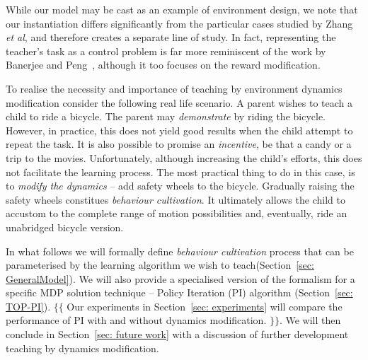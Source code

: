 While our model may be cast as an example of environment design, we
note that our instantiation differs significantly from the particular
cases studied by Zhang \emph{et al}, and therefore creates a separate
line of study. In fact, representing the teacher's task as a control
problem is far more reminiscent of the work by Banerjee and
Peng~\cite{banerjee_peng_2005}, although it too focuses on the reward
modification.

To realise the necessity and importance of teaching by environment
dynamics modification consider the following real life scenario. A
parent wishes to teach a child to ride a bicycle. The parent may {\em
  demonstrate} by riding the bicycle. However, in practice, this does
not yield good results when the child attempt to repeat the task. It
is also possible to promise an {\em incentive}, be that a candy or a
trip to the movies. Unfortunately, although increasing the child's
efforts, this does not facilitate the learning process. The most
practical thing to do in this case, is to {\em modify the dynamics} --
add safety wheels to the bicycle. Gradually raising the safety wheels
constitues {\em behaviour cultivation}. It ultimately allows the
child to accustom to the complete range of motion possibilities and,
eventually, ride an unabridged bicycle version.

In what follows we will formally define {\em behaviour cultivation}
process that can be parameterised by the learning algorithm we wish to
teach(Section~\ref{sec: GeneralModel}).
We will also provide a specialised
version of the formalism for a specific MDP solution technique --
Policy Iteration (PI) algorithm (Section~\ref{sec: TOP-PI}). $\{\{$
Our experiments in Section~\ref{sec: experiments} will compare the
performance of PI with and without dynamics modification. $\}\}$. We
will then conclude in Section~\ref{sec: future work} with a discussion
of further development teaching by dynamics modification.

